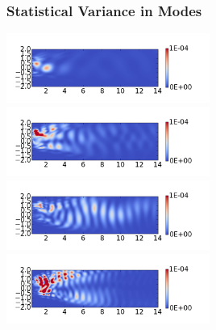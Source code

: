 \documentclass[9pt]{beamer}
\begin{document}
\begin{frame}
\frametitle{Statistical Variance in Modes}
\label{sec-3-4}

\centering
\includegraphics[width=0.5\textwidth]{VariancePOD1} \\
\includegraphics[width=0.5\textwidth]{VariancePOD2} \\
\includegraphics[width=0.5\textwidth]{VariancePOD3} \\
\includegraphics[width=0.5\textwidth]{VariancePOD4} \\
\end{frame}
\end{document}
